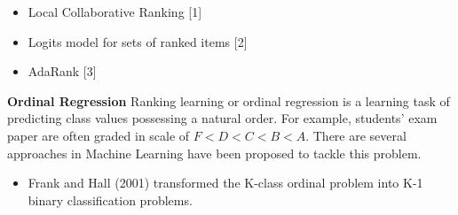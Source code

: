 \begin{itemize}
	\item Local Collaborative Ranking [1]
	\item Logits model for sets of ranked items [2]
	\item AdaRank [3]
\end{itemize}

\textbf{Ordinal Regression}
Ranking learning or ordinal regression is a learning task of predicting class values possessing a natural order. For example, students' exam paper are often graded in scale of $F < D < C < B < A$. There are several approaches in Machine Learning have been proposed to tackle this problem. 

\begin{itemize}
	\item Frank and Hall (2001) transformed the K-class ordinal problem into K-1 binary classification problems.
\end{itemize}
